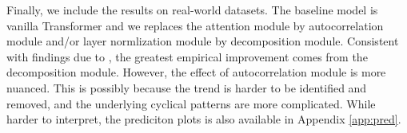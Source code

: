 Finally, we include the results on real-world datasets. 
The baseline model is vanilla Transformer and we replaces the attention module by autocorrelation module and/or layer normlization module by decomposition module. 
Consistent with findings due to \citet{https://doi.org/10.48550/arxiv.2106.13008}, the greatest empirical improvement comes from the decomposition module. 
However, the effect of autocorrelation module is more nuanced. 
This is possibly because the trend is harder to be identified and removed, and the underlying cyclical patterns are more complicated. 
While harder to interpret, the prediciton plots is also available in Appendix \ref{app:pred}. 
